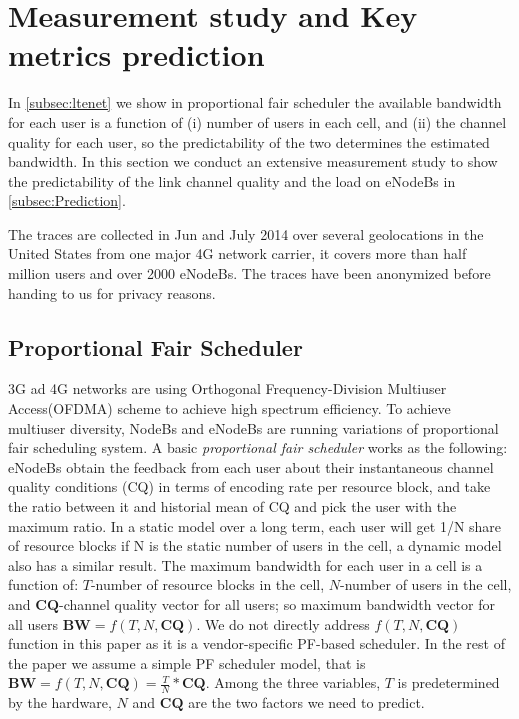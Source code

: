 \section{Measurement study and Key metrics prediction}\label{sec:prediction}
In \autoref{subsec:ltenet} we show in proportional fair scheduler the available bandwidth for each user is a function of (i) number of users in each cell, and (ii) the channel quality for each user, so the predictability of the two determines the estimated bandwidth. In this section we conduct an extensive measurement study to show the predictability of the link channel quality and the load on eNodeBs in \autoref{subsec:Prediction}. 

The traces are collected in Jun and July 2014 over several geolocations in the United States from one major 4G network carrier, it covers more than half million users and over 2000 eNodeBs. The traces have been anonymized before handing to us for privacy reasons. 

\subsection{Proportional Fair Scheduler}\label{subsec:ltenet}
3G ad 4G networks are using Orthogonal Frequency-Division Multiuser Access(OFDMA) scheme to achieve high spectrum efficiency. To achieve multiuser diversity, NodeBs and eNodeBs are running variations of proportional fair scheduling system. A basic \textit{proportional fair scheduler} works as the following: eNodeBs obtain the feedback from each user about their instantaneous channel quality conditions (CQ) in terms of encoding rate per resource block, and take the ratio between it and historial mean of CQ and pick the user with the maximum ratio. In a static model over a long term, each user will get 1/N share of resource blocks if N is the static number of users in the cell, a dynamic model also has a similar result\cite{PFINFOCOM}. The maximum bandwidth for each user in a cell is a function of: $T$-number of resource blocks in the cell, $N$-number of users in the cell, and $\mathbf{CQ}$-channel quality vector for all users; so maximum bandwidth vector for all users $\mathbf{BW} = f(T, N, \mathbf{CQ})$. We do not directly address $f(T, N, \mathbf{CQ})$ function in this paper as it is a vendor-specific PF-based scheduler. In the rest of the paper we assume a simple PF scheduler model, that is $\mathbf{BW} = f(T, N, \mathbf{CQ})=\frac{T}{N}*\mathbf{CQ}$. Among the three variables, $T$ is predetermined by the hardware, $N$ and $\mathbf{CQ}$ are the two factors we need to predict. 

